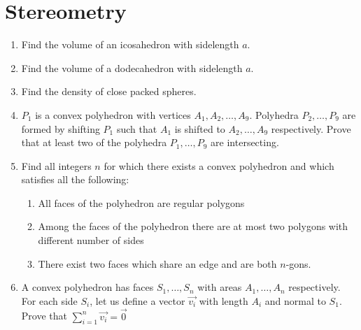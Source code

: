 \documentclass{article}
\begin{document}
\section{Stereometry}
\begin{enumerate}
\item
Find the volume of an icosahedron with sidelength $a$.

\item
Find the volume of a dodecahedron with sidelength $a$.

\item
Find the density of close packed spheres.

\item %
$P_1$ is a convex polyhedron with vertices $A_1, A_2,\dots,A_9$. Polyhedra $P_2,\dots,P_9$ are formed by shifting $P_1$ such that $A_1$ is shifted to $A_2,\dots,A_9$ respectively. Prove that at least two of the polyhedra $P_1,\dots,P_9$ are intersecting.

\item %
Find all integers $n$ for which there exists a convex polyhedron and which satisfies all the following:
\begin{enumerate}
  \item All faces of the polyhedron are regular polygons
  \item Among the faces of the polyhedron there are at most two polygons with different number of sides
  \item There exist two faces which share an edge and are both $n$-gons.
\end{enumerate}

\item %
A convex polyhedron has faces $S_1,\dots,S_n$ with areas $A_1,\dots,A_n$ respectively. For each side $S_i$, let us define a vector $\vec{v_i}$ with length $A_i$ and normal to $S_1$. Prove that $\sum_{i=1}^n \vec{v_i} = \vec{0}$


\end{enumerate}
\end{document}
